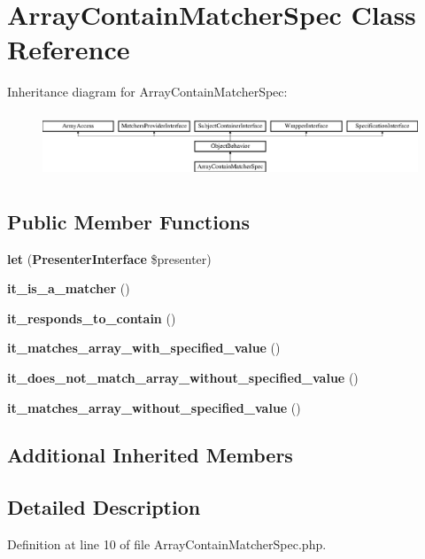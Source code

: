 \section{Array\+Contain\+Matcher\+Spec Class Reference}
\label{classspec_1_1_php_spec_1_1_matcher_1_1_array_contain_matcher_spec}
Inheritance diagram for Array\+Contain\+Matcher\+Spec\+:\begin{figure}[H]
\begin{center}
\leavevmode
\includegraphics[height=1.953488cm]{classspec_1_1_php_spec_1_1_matcher_1_1_array_contain_matcher_spec}
\end{center}
\end{figure}
\subsection*{Public Member Functions}
\begin{DoxyCompactItemize}
\item 
{\bf let} ({\bf Presenter\+Interface} \$presenter)
\item 
{\bf it\+\_\+is\+\_\+a\+\_\+matcher} ()
\item 
{\bf it\+\_\+responds\+\_\+to\+\_\+contain} ()
\item 
{\bf it\+\_\+matches\+\_\+array\+\_\+with\+\_\+specified\+\_\+value} ()
\item 
{\bf it\+\_\+does\+\_\+not\+\_\+match\+\_\+array\+\_\+without\+\_\+specified\+\_\+value} ()
\item 
{\bf it\+\_\+matches\+\_\+array\+\_\+without\+\_\+specified\+\_\+value} ()
\end{DoxyCompactItemize}
\subsection*{Additional Inherited Members}


\subsection{Detailed Description}


Definition at line 10 of file Array\+Contain\+Matcher\+Spec.\+php.



